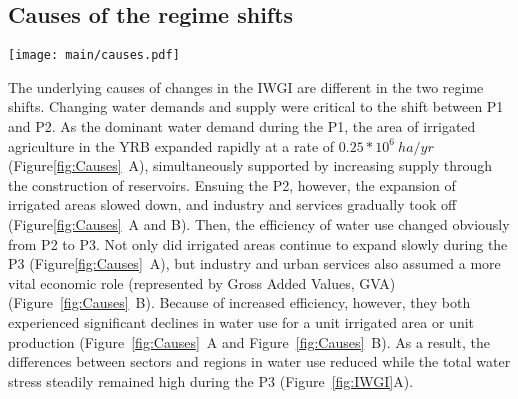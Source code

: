 \documentclass[draft]{../agujournal2019}
\begin{document}
\subsection{Causes of the regime shifts}\label{Res.2}

\begin{figure*}[th!]
	\centering
	\texttt{[image: main/causes.pdf]}
	\caption{
		Causes of water governance regime shifts in the YRB.\
		\textbf{A.} Changes in the total irrigated area (orange line) and water use intensity ($WU/A$, water use divided by the irrigated area, the green dot line).
		\textbf{B.} Changes in gross values added (GVA) of industry and services (blue line) and their water use intensities ($WU/GVA$ WU divided by the GVA, the red dot line).
		\textbf{C.} Completed time of each new reservoir and their located region's water use (LWU) percentages as a proportion of the total basinal water use (BWU) at that time. Dashed lines denote average of these percentages in different regimes. Red circles (Major Reservoirs) denote the reservoirs mainly for managing and regulating the whole basin.
		The size of each circle indicates the magnitude of its water storage capacity.
		\textbf{D.} Social atmosphere (red triangles) and national-level governance policies (the circles, different colours denote signed by different state agencies). The light grey bars count official documents related to the YRB on a basinal scale (the Yellow River Events).
	}\label{fig:Causes}
\end{figure*}

The underlying causes of changes in the IWGI are different in the two regime shifts.
Changing water demands and supply were critical to the shift between P1 and P2.
As the dominant water demand during the P1, the area of irrigated agriculture in the YRB expanded rapidly at a rate of $0.25*10^6~ha/yr$ (Figure\ref{fig:Causes}~A), simultaneously supported by increasing supply through the construction of reservoirs.
Ensuing the P2, however, the expansion of irrigated areas slowed down, and industry and services gradually took off (Figure\ref{fig:Causes}~A and B).
Then, the efficiency of water use changed obviously from P2 to P3.
Not only did irrigated areas continue to expand slowly during the P3 (Figure\ref{fig:Causes}~A), but industry and urban services also assumed a more vital economic role (represented by Gross Added Values, GVA) (Figure~\ref{fig:Causes}~B).
Because of increased efficiency, however, they both experienced significant declines in water use for a unit irrigated area or unit production (Figure~\ref{fig:Causes}~A and Figure~\ref{fig:Causes}~B).
As a result, the differences between sectors and regions in water use reduced while the total water stress steadily remained high during the P3 (Figure~\ref{fig:IWGI}A).
\end{document}
